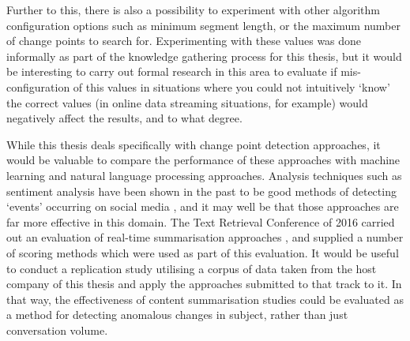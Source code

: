 \documentclass[../main.tex]{subfiles}
\begin{document}
Further to this, there is also a possibility to experiment with other algorithm configuration options such as minimum segment length, or the maximum number of change points to search for. Experimenting with these values was done informally as part of the knowledge gathering process for this thesis, but it would be interesting to carry out formal research in this area to evaluate if mis-configuration of this values in situations where you could not intuitively `know' the correct values (in online data streaming situations, for example) would negatively affect the results, and to what degree.

While this thesis deals specifically with change point detection approaches, it would be valuable to compare the performance of these approaches with machine learning and natural language processing approaches. Analysis techniques such as sentiment analysis have been shown in the past to be good methods of detecting `events' occurring on social media \cite{Alvanaki2011}, and it may well be that those approaches are far more effective in this domain. The Text Retrieval Conference of 2016 carried out an evaluation of real-time summarisation approaches \cite{trec2016}, and supplied a number of scoring methods which were used as part of this evaluation. It would be useful to conduct a replication study utilising a corpus of data taken from the host company of this thesis and apply the approaches submitted to that track to it. In that way, the effectiveness of content summarisation studies could be evaluated as a method for detecting anomalous changes in subject, rather than just conversation volume.
\end{document}
